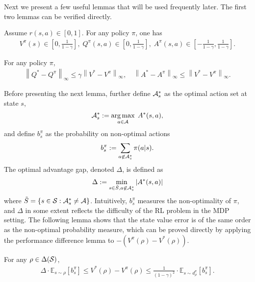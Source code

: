 Next we present a few useful lemmas that will be used frequently later. The first two lemmas can be verified directly.
\begin{lemma}
    {Assume $r(s,a) \in [0,1]$.} For any policy $\pi$, one has
    \begin{align*}
        V^\pi(s) \in \left[ 0, \frac{1}{1-\gamma} \right], \; Q^\pi(s,a) \in \left[ 0, \frac{1}{1-\gamma} \right], \; A^\pi(s,a) \in \left[ -\frac{1}{1-\gamma}, \frac{1}{1-\gamma} \right].
    \end{align*}
\end{lemma}

\begin{lemma}\label{lem:QV-relation}
    For any policy $\pi$,
    \begin{align*}
        \left\| Q^* - Q^\pi \right\|_\infty \leq \gamma \left\| V^* - V^\pi \right\|_\infty, \quad \left\| A^* - A^\pi \right\|_\infty \leq \left\| V^* - V^\pi \right\|_\infty.
    \end{align*}
\end{lemma}
\noindent Before presenting the next lemma, further define ${\cal A}^*_s$ as the optimal action set at state $s$,
\begin{align*}
    {\cal A}^*_s := \operatorname*{arg\,max}_{a\in{\cal A}} \; A^*(s,a),
\end{align*}
and define $b^\pi_s$ as the probability on non-optimal actions
\begin{align*}
    b^\pi_s := \sum_{a\not\in{\cal A}^*_s} \pi(a|s).
\end{align*}
The optimal advantage gap, denoted $\Delta$,  is defined as
\begin{align*}
    \Delta := \min_{s\in\tilde{S}, a\not\in{\cal A}^*_s} \left| A^*(s,a) \right|
\end{align*}
where $\tilde{S} = \left\{ s\in{\cal S}: {\cal A}^*_s \neq {\cal A} \right\}$. Intuitively, $b^\pi_s$ measures  the non-optimality of $\pi$, and $\Delta$ in some extent reflects the difficulty of the RL problem in the MDP setting. The following lemma shows that the state value error is of the same order as the non-optimal  probability measure, which can be proved directly by applying the performance difference lemma to $-(V^\pi(\rho)-V^*(\rho))$.
\begin{lemma}\label{lem:bsk-bounds}
    For any $\rho \in \Delta({\cal S})$,
    \begin{align*}
        \Delta \cdot \mathbb{E}_{s\sim\rho} [b^\pi_s] \leq V^*(\rho) - V^\pi(\rho) \leq \frac{1}{(1-\gamma)^2} \cdot \mathbb{E}_{s\sim d^\pi_\rho} [b^\pi_s].
    \end{align*}
\end{lemma}

